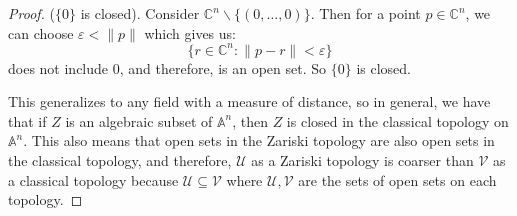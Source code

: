 \documentclass{article}
\begin{document}
\begin{itemize}
\begin{proof}
                ($\{0\}$ is closed). Consider $\mathbb{C}^{n}\backslash \{(0, \ldots , 0)\}$. Then for a point $p \in \mathbb{C}^{n}$, we can choose $\varepsilon < \lVert p \rVert$ which gives us:
                    \begin{equation*}
                        \{r \in \mathbb{C}^{n} : \lVert p - r \rVert < \varepsilon\} 
                    \end{equation*}
                does not include $0$, and therefore, is an open set. So $\{0\}$ is closed.

                This generalizes to any field with a measure of distance, so in general, we have that if $Z$ is an algebraic subset of $\mathbb{A}^{n}$, then $Z$ is closed in the classical topology on $\mathbb{A}^{n}$. This also means that open sets in the Zariski topology are also open sets in the classical topology, and therefore, $\mathcal{U}$ as a Zariski topology is coarser than $\mathcal{V}$ as a classical topology because $\mathcal{U} \subseteq \mathcal{V}$ where $\mathcal{U}, \mathcal{V}$ are the sets of open sets on each topology.
            \end{proof}
    \end{itemize}
\end{document}
